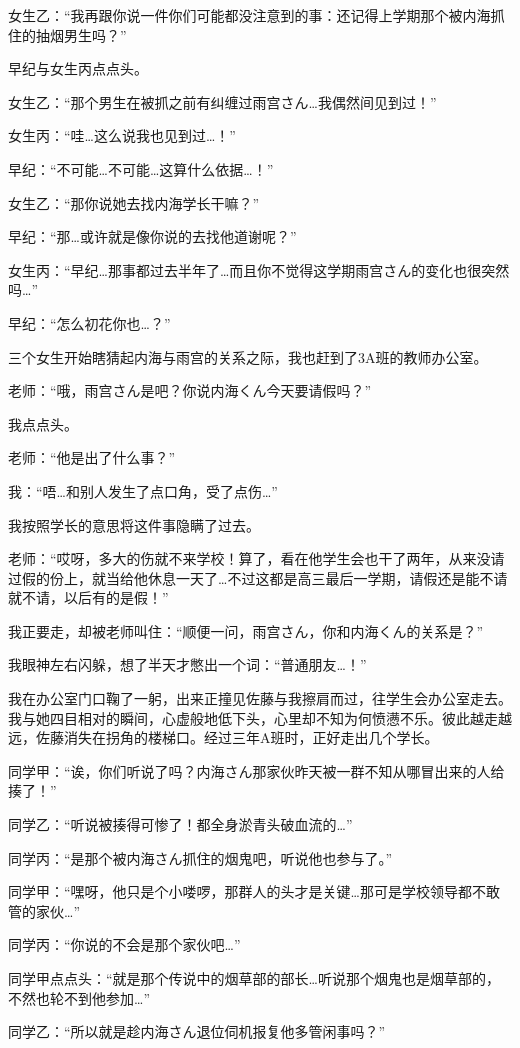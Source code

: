 女生乙：“我再跟你说一件你们可能都没注意到的事：还记得上学期那个被内海抓住的抽烟男生吗？”

早纪与女生丙点点头。

女生乙：“那个男生在被抓之前有纠缠过雨宫さん…我偶然间见到过！”

女生丙：“哇…这么说我也见到过…！”

早纪：“不可能…不可能…这算什么依据…！”

女生乙：“那你说她去找内海学长干嘛？”

早纪：“那…或许就是像你说的去找他道谢呢？”

女生丙：“早纪…那事都过去半年了…而且你不觉得这学期雨宫さん的变化也很突然吗…”

早纪：“怎么初花你也…？”

三个女生开始瞎猜起内海与雨宫的关系之际，我也赶到了3A班的教师办公室。

老师：“哦，雨宫さん是吧？你说内海くん今天要请假吗？”

我点点头。

老师：“他是出了什么事？”

我：“唔…和别人发生了点口角，受了点伤…”

我按照学长的意思将这件事隐瞒了过去。

老师：“哎呀，多大的伤就不来学校！算了，看在他学生会也干了两年，从来没请过假的份上，就当给他休息一天了…不过这都是高三最后一学期，请假还是能不请就不请，以后有的是假！”

我正要走，却被老师叫住：“顺便一问，雨宫さん，你和内海くん的关系是？”

我眼神左右闪躲，想了半天才憋出一个词：“普通朋友…！”

我在办公室门口鞠了一躬，出来正撞见佐藤与我擦肩而过，往学生会办公室走去。我与她四目相对的瞬间，心虚般地低下头，心里却不知为何愤懑不乐。彼此越走越远，佐藤消失在拐角的楼梯口。经过三年A班时，正好走出几个学长。

同学甲：“诶，你们听说了吗？内海さん那家伙昨天被一群不知从哪冒出来的人给揍了！”

同学乙：“听说被揍得可惨了！都全身淤青头破血流的…”

同学丙：“是那个被内海さん抓住的烟鬼吧，听说他也参与了。”

同学甲：“嘿呀，他只是个小喽啰，那群人的头才是关键…那可是学校领导都不敢管的家伙…”

同学丙：“你说的不会是那个家伙吧…”

同学甲点点头：“就是那个传说中的烟草部的部长…听说那个烟鬼也是烟草部的，不然也轮不到他参加…”

同学乙：“所以就是趁内海さん退位伺机报复他多管闲事吗？”

